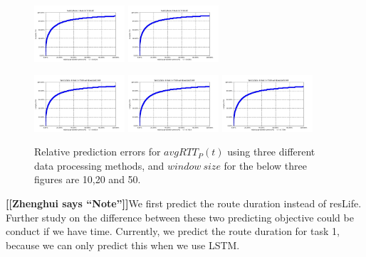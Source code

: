 \documentclass[sigconf]{acmart}
\newcommand{\hui}[1]{{\bf \color{purple} [[Zhenghui says ``#1'']]}}
\begin{document}
\begin{figure} [!htb] 
	\centering  
	\includegraphics[width=0.3\textwidth]{fig4/data-1-task-3-7030-RF.jpg}  
	\includegraphics[width=0.3\textwidth]{fig4/data-2-task-3-7030-RF.jpg} 
\end{figure} 
\begin{figure} 	
	\includegraphics[width=0.3\textwidth]{fig4/data-3-task-3-7030-windowsize10-RF.jpg} 
	\includegraphics[width=0.3\textwidth]{fig4/data-3-task-3-7030-windowsize20-RF.jpg}
	\includegraphics[width=0.3\textwidth]{fig4/data-3-task-3-7030-windowsize50-RF.jpg}
	\caption{Relative prediction errors for $avgRTT_P(t)$ using three different data processing methods, and $window\ size$ for the below three figures are 10,20 and 50.}
	\label{fig:task3_RF}
\end{figure}

\hui{Note}We first predict the route duration instead of resLife. Further study on the difference between these two predicting objective could be conduct if we have time. Currently, we predict the route duration for task 1, because we can only predict this when we use LSTM.
\end{document}
